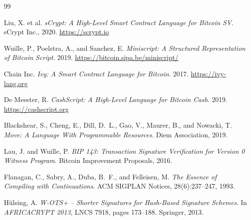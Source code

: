 \documentclass[11pt,a4paper]{article}
\begin{document}
\begin{thebibliography}{99}

Liu, X. et al.
\textit{sCrypt: A High-Level Smart Contract Language for Bitcoin SV}.
sCrypt Inc., 2020.
\url{https://scrypt.io}

Wuille, P., Poelstra, A., and Sanchez, E.
\textit{Miniscript: A Structured Representation of Bitcoin Script}.
2019.
\url{https://bitcoin.sipa.be/miniscript/}

Chain Inc.
\textit{Ivy: A Smart Contract Language for Bitcoin}.
2017.
\url{https://ivy-lang.org}

De Meester, R.
\textit{CashScript: A High-Level Language for Bitcoin Cash}.
2019.
\url{https://cashscript.org}

Blackshear, S., Cheng, E., Dill, D.~L., Gao, V., Maurer, B., and Nowacki, T.
\textit{Move: A Language With Programmable Resources}.
Diem Association, 2019.

Lau, J. and Wuille, P.
\textit{BIP 143: Transaction Signature Verification for Version 0 Witness Program}.
Bitcoin Improvement Proposals, 2016.

Flanagan, C., Sabry, A., Duba, B.~F., and Felleisen, M.
\textit{The Essence of Compiling with Continuations}.
ACM SIGPLAN Notices, 28(6):237--247, 1993.

H{\"u}lsing, A.
\textit{W-OTS+ -- Shorter Signatures for Hash-Based Signature Schemes}.
In \textit{AFRICACRYPT 2013}, LNCS 7918, pages 173--188. Springer, 2013.

\end{thebibliography}
\end{document}
